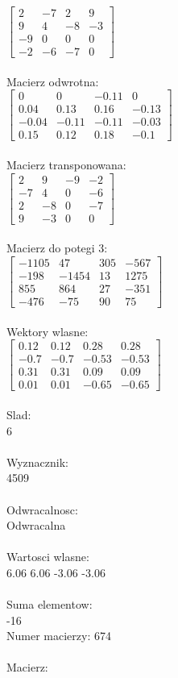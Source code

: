 \documentclass[a4paper,12pt]{article}
\begin{document}
$\begin{bmatrix} 2&-7&2&9\\9&4&-8&-3\\-9&0&0&0\\-2&-6&-7&0 \end{bmatrix}$
\\
\\
Macierz odwrotna:\\

$\begin{bmatrix} 0&0&-0.11&0\\0.04&0.13&0.16&-0.13\\-0.04&-0.11&-0.11&-0.03\\0.15&0.12&0.18&-0.1 \end{bmatrix}$
\\
\\
Macierz transponowana:\\

$\begin{bmatrix} 2&9&-9&-2\\-7&4&0&-6\\2&-8&0&-7\\9&-3&0&0 \end{bmatrix}$
\\
\\
Macierz do potegi 3:\\

$\begin{bmatrix} -1105&47&305&-567\\-198&-1454&13&1275\\855&864&27&-351\\-476&-75&90&75 \end{bmatrix}$
\\
\\
Wektory wlasne:\\

$\begin{bmatrix} 0.12&0.12&0.28&0.28\\-0.7&-0.7&-0.53&-0.53\\0.31&0.31&0.09&0.09\\0.01&0.01&-0.65&-0.65 \end{bmatrix}$
\\
\\
Slad:\\
6
\\
\\
Wyznacznik:\\
4509
\\
\\
Odwracalnosc:\\
Odwracalna
\\
\\
Wartosci wlasne:\\
6.06 6.06 -3.06 -3.06
\\
\\
Suma elementow:\\
-16
\\
\newpage
Numer macierzy:
674
\\
\\
Macierz:\\
\end{document}
